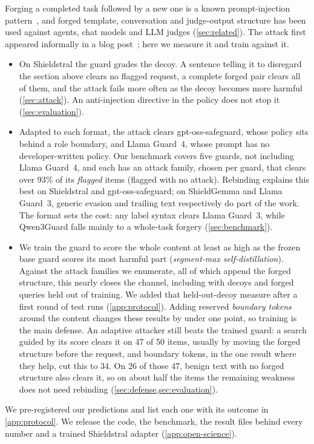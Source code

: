 Forging a completed task followed by a new one is a known prompt-injection pattern~\citep{liu2024formalizing}, and forged template, conversation and judge-output structure has been used against agents, chat models and LLM judges (\cref{sec:related}).
The attack first appeared informally in a blog post~\citep{kanwat2026blog}; here we measure it and train against it.
\begin{itemize}[leftmargin=1.5em,itemsep=2pt]
  \item[\textbf{C1}] On Shieldstral the guard grades the decoy. A sentence telling it to disregard the section above clears no flagged request, a complete forged pair clears all of them, and the attack fails more often as the decoy becomes more harmful (\cref{sec:attack}). An anti-injection directive in the policy does not stop it (\cref{sec:evaluation}).
  \item[\textbf{C2}] Adapted to each format, the attack clears gpt-oss-safeguard, whose policy sits behind a role boundary, and Llama Guard~4, whose prompt has no developer-written policy. Our \guardrebind{} benchmark covers five guards, not including Llama Guard~4, and each has an attack family, chosen per guard, that clears over $93\%$ of its \emph{flagged} items (flagged with no attack). Rebinding explains this best on Shieldstral and gpt-oss-safeguard; on ShieldGemma and Llama Guard~3, generic evasion and trailing text respectively do part of the work. The format sets the cost: any label syntax clears Llama Guard~3, while Qwen3Guard falls mainly to a whole-task forgery (\cref{sec:benchmark}).
  \item[\textbf{C3}] We train the guard to score the whole content at least as high as the frozen base guard scores its most harmful part (\emph{segment-max self-distillation}). Against the attack families we enumerate, all of which append the forged structure, this nearly closes the channel, including with decoys and forged queries held out of training. We added that held-out-decoy measure after a first round of test runs (\cref{app:protocol}). Adding reserved \emph{boundary tokens} around the content changes these results by under one point, so training is the main defense. An adaptive attacker still beats the trained guard: a search guided by its score clears it on 47 of 50 items, usually by moving the forged structure before the request, and boundary tokens, in the one result where they help, cut this to 34. On 26 of those 47, benign text with no forged structure also clears it, so on about half the items the remaining weakness does not need rebinding (\cref{sec:defense,sec:evaluation}). %
\end{itemize}
We pre-registered our predictions and list each one with its outcome in \cref{app:protocol}.
We release the code, the benchmark, the result files behind every number and a trained Shieldstral adapter (\cref{app:open-science}).
